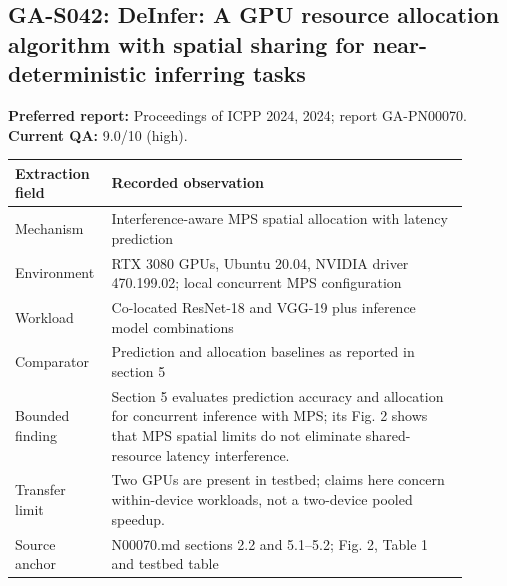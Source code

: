 \subsection{GA-S042: DeInfer: A GPU resource allocation algorithm with spatial sharing for near-deterministic inferring tasks}
\textbf{Preferred report:} Proceedings of ICPP 2024, 2024; report GA-PN00070. \textbf{Current QA:} 9.0/10 (high).
\begin{longtable}{P{0.15\linewidth}P{0.75\linewidth}}
\toprule Extraction field & Recorded observation\\\midrule\endhead
Mechanism & Interference-aware MPS spatial allocation with latency prediction\\
Environment & RTX 3080 GPUs, Ubuntu 20.04, NVIDIA driver 470.199.02; local concurrent MPS configuration\\
Workload & Co-located ResNet-18 and VGG-19 plus inference model combinations\\
Comparator & Prediction and allocation baselines as reported in section 5\\
Bounded finding & Section 5 evaluates prediction accuracy and allocation for concurrent inference with MPS; its Fig. 2 shows that MPS spatial limits do not eliminate shared-resource latency interference.\\
Transfer limit & Two GPUs are present in testbed; claims here concern within-device workloads, not a two-device pooled speedup.\\
Source anchor & N00070.md sections 2.2 and 5.1–5.2; Fig. 2, Table 1 and testbed table\\
\bottomrule\end{longtable}
